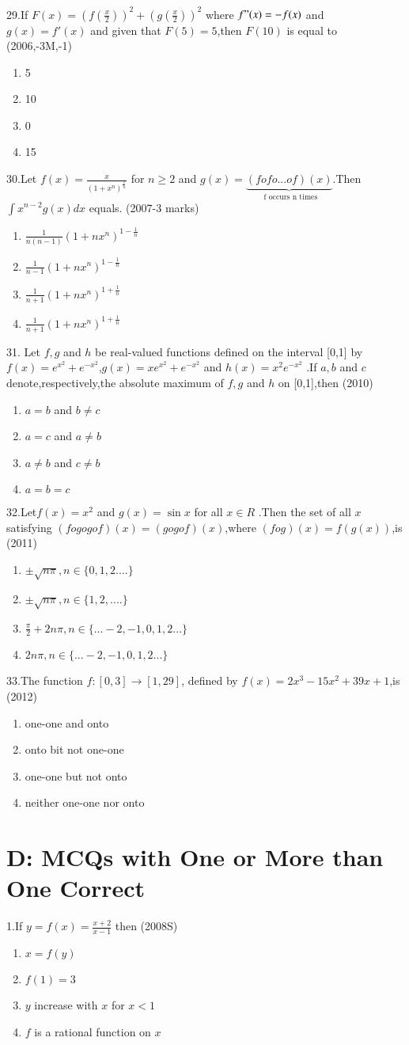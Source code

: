 \documentclass[journal,12pt,twocolumn]{IEEEtran}
\theoremstyle{remark}
\begin{document}
29.If $F(x)=\left( f\left( \frac{x}{2}\right) \right)^2 + \left(g\left (\frac{x}{2}\right) \right)^2$ where $f"(x)=-f(x)$ and $ g(x)=f'(x)$ and given that $F(5)=5$,then $F(10)$ is equal to 
\hfill(2006,-3M,-1)
\begin{enumerate}
    \item 5
    \item 10
    \item 0
    \item 15
\end{enumerate}
30.Let $f(x)=\frac{x}{(1+x^n)^\frac{1}{n}}$ for $ n\geq2$ and $g(x)= \underbrace {(fofo...of)(x)}_{\text{ f occurs n times}}$.Then $\int x^{n-2} g(x)dx$ equals.
\hfill(2007-3 marks)\\
\begin{enumerate}
    \item$ \frac{1}{n(n-1)} (1+nx^n)^{1-\frac{1}{n}} $
    \item$ \frac{1}{n-1} (1+nx^n)^{1-\frac{1}{n}} $
    \item$ \frac{1}{n+1} (1+nx^n)^{1+\frac{1}{n}} $
    \item$ \frac{1}{n+1} (1+nx^n)^{1+\frac{1}{n}} $
\end{enumerate}
31. Let $f,g$ and $h$ be real-valued functions defined on the interval [0,1] by $f(x)= e^{x^2} + e^{-x^2}$,$g(x)=xe^{x^2}+ e^{-x^2}$ and $h(x)=x^2e^{-x^2}$ .If $a,b$ and $c$ denote,respectively,the absolute maximum of $f,g$ and $h$ on [0,1],then 
\hfill(2010)
\begin{enumerate}
    \item $a=b$ and $b\neq c$
    \item $a=c$ and $a\neq b$
    \item $a\neq b$ and $c \neq b$
    \item $a=b=c$
\end{enumerate}
32.Let$f(x)=x^2$ and $g(x)=\sin x$ for all $x\in R$ .Then the set of all $x$ satisfying $(fogogof)(x)=(gogof)(x)$,where $(fog)(x)=f(g(x))$,is
\hfill(2011)
\begin{enumerate}
    \item $ \pm \sqrt{n\pi},n\in \{0,1,2....\}$
    \item $ \pm \sqrt{n\pi},n\in \{1,2,....\}$
    \item $ \frac{\pi}{2}+2n\pi,n \in\{...-2,-1,0,1,2...\} $
    \item $ 2n\pi,n\in \{...-2,-1,0,1,2...\}$
\end{enumerate}
33.The function $ f:[0,3] \rightarrow [1,29] $, defined by $ f(x)=2x^3-15x^2+39x+1 $,is 
\hfill(2012)
\begin{enumerate}
    \item one-one and onto 
    \item onto bit not one-one 
    \item one-one but not onto
    \item neither one-one nor onto
\end{enumerate}
\section {D: MCQs with One or More than One Correct}
1.If $y=f(x)=\frac{x+2}{x-1}$ then
\hfill(2008S)
\begin{enumerate}
    \item $x=f(y)$
    \item $f(1)=3$
    \item $y$ increase with $x$ for $x<1$
    \item $f$ is a rational function on $x$
\end{enumerate}
\end{document}
